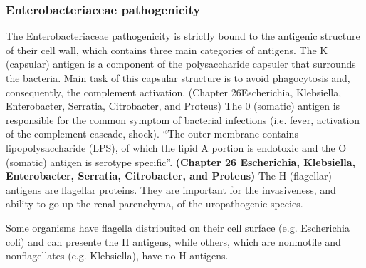 \documentclass[11pt]{report}
\begin{document}
\subsubsection{Enterobacteriaceae pathogenicity}

The Enterobacteriaceae pathogenicity is strictly bound to the antigenic structure of their cell wall, which contains three main categories of antigens.
The K (capsular) antigen is a component of the polysaccharide capsuler that surrounds the bacteria. Main task of this capsular structure is to avoid phagocytosis and, consequently, the complement activation. (Chapter 26Escherichia, Klebsiella, Enterobacter, Serratia, Citrobacter, and Proteus)
The 0 (somatic) antigen is responsible for the common symptom of bacterial infections (i.e. fever, activation of the complement cascade, shock).
“The outer membrane contains lipopolysaccharide (LPS), of which the lipid A portion is endotoxic and the O (somatic) antigen is serotype specific”.  \textbf{(Chapter 26 Escherichia, Klebsiella, Enterobacter, Serratia, Citrobacter, and Proteus)}
The H (flagellar) antigens are flagellar proteins. They are important for the invasiveness, and ability to go up the renal parenchyma, of the uropathogenic species.

Some organisms have flagella distribuited on their cell surface (e.g. Escherichia coli) and can presente the H antigens, while others, which are nonmotile and nonflagellates (e.g. Klebsiella), have no H antigens. 





















































\end{document}
